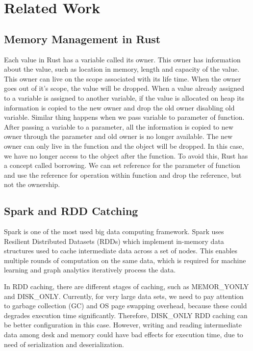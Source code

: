 \chapter{Related Work}
\label{chapter:relatedwork}
\thispagestyle{myheadings}

\section{Memory Management in Rust}
\label{sec:history}

Each value in Rust has a variable called its owner. This owner has information about the value, such as location in memory, 
length and capacity of the value. This owner can live on the scope associated with its life time. When the owner goes out of it’s scope, 
the value will be dropped. When a value already assigned to a variable is assigned to another variable, if the value is allocated 
on heap its information is copied to the new owner and drop the old owner disabling old variable. Similar thing happens when we pass variable to parameter of function. 
After passing a variable to a parameter, all the information is copied to new owner through the parameter and old owner is no longer available. 
The new owner can only live in the function and the object will be dropped. In this case, we have no longer access to the object after the function. 
To avoid this, Rust has a concept called borrowing. We can set reference for the parameter of function and use the reference for operation within function and drop the reference, 
but not the ownership. 


\section{Spark and RDD Catching}
\label{sec:history}

Spark is one of the most used big data computing framework. Spark uses Resilient Distributed Datasets (RDDs) which implement in-memory data structures 
used to cache intermediate data across a set of nodes. This enables multiple rounds of computation on the same data, which is required for machine learning 
and graph analytics iteratively process the data. 

In RDD caching, there are different stages of caching, such as MEMOR\_YONLY and DISK\_ONLY. 
Currently, for very large data sets, we need to pay attention to garbage collection (GC) and OS page swapping overhead, 
because these could degrades execution time significantly. Therefore, DISK\_ONLY RDD caching can be better configuration in this case. 
However, writing and reading intermediate data among desk and memory could have bad effects for execution time, due to need of serialization and deserialization. 

